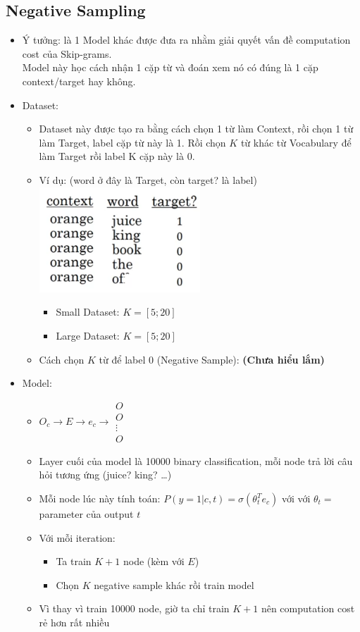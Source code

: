 \documentclass[12pt,a4paper]{report}
\begin{document}
		\subsection{Negative Sampling}
			\begin{itemize}
			\item Ý tưởng: là 1 Model khác được đưa ra nhằm giải quyết vấn đề computation cost của Skip-grams.\\ Model này học cách nhận 1 cặp từ và đoán xem nó có đúng là 1 cặp context/target hay không.
			\item Dataset:
				\begin{itemize}
				\item Dataset này được tạo ra bằng cách chọn 1 từ làm Context, rồi chọn 1 từ làm Target, label cặp từ này là 1. Rồi chọn $K$ từ khác từ Vocabulary để làm Target rồi label K cặp này là 0.
				\item Ví dụ: (word ở đây là Target, còn target? là label)\\\includegraphics[width=0.5\textwidth]{5}
					\begin{itemize}
					\item Small Dataset: $K = [5;20]$
					\item Large Dataset: $K = [5;20]$
					\end{itemize}
				\item Cách chọn $K$ từ để label 0 (Negative Sample): \textbf{(Chưa hiểu lắm)}
				\end{itemize}
			\item Model:
				\begin{itemize}
				\item $O_c \rightarrow E \rightarrow e_c \rightarrow \begin{matrix}
				O\\
				O\\
				\vdots\\
				O
				\end{matrix}$
				\item Layer cuối của model là 10000 binary classification, mỗi node trả lời câu hỏi tương ứng (juice? king? \dots)
				\item Mỗi node lúc này tính toán: $P(y=1|c, t)=\sigma(\theta^T_te_c)$ với với $\theta_t = $ parameter của output $t$
				\item Với mỗi iteration: 
					\begin{itemize}
					\item Ta train $K+1$ node (kèm với $E$)
					\item Chọn $K$ negative sample khác rồi train model
					\end{itemize}
				\item Vì thay vì train 10000 node, giờ ta chỉ train $K+1$ nên computation cost rẻ hơn rất nhiều
				\end{itemize}
			\end{itemize}
\end{document}
